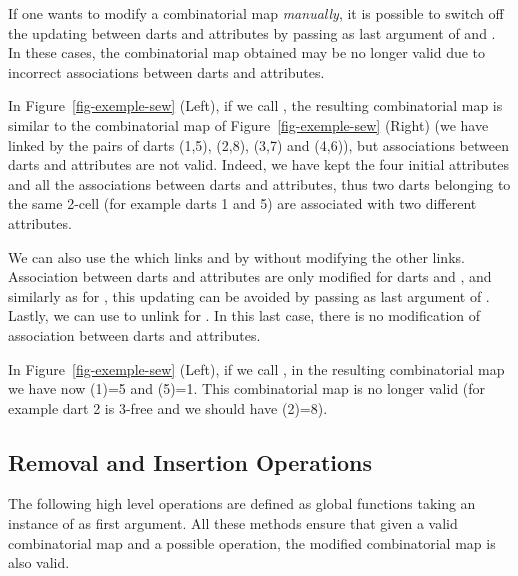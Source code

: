 \begin{ccAdvanced}
  If one wants to modify a combinatorial map \emph{manually}, it is 
  possible to switch off the updating between
  darts and attributes by passing  as last argument of
   and
  .  In these cases, the
  combinatorial map obtained may be no longer valid due to incorrect
  associations between darts and attributes.
  
  In Figure~\ref{fig-exemple-sew} (Left), if we call
  , the resulting combinatorial map is similar
  to the combinatorial map of Figure~\ref{fig-exemple-sew} (Right)
  (we have linked by \betatrois{} the pairs of darts (1,5), (2,8),
  (3,7) and (4,6)), but associations between darts and attributes
  are not valid. Indeed, we have kept the four initial attributes
  and all the associations between darts and attributes, thus two
  darts belonging to the same 2-cell (for example darts 1 and 5) are
  associated with two different attributes.

  We can also use the
   which links
   and  by \betai{} without modifying the other
  links.
  Association between darts and attributes are only modified for darts
   and , and similarly as for , this
  updating can be avoided by passing  as last argument of
  .  Lastly, we can use
   to unlink  for \betai{}. In this
  last case, there is no modification of association between darts and
  attributes.

  In Figure~\ref{fig-exemple-sew} (Left), if we call
  , in the resulting combinatorial map we have
  now \betatrois{}(1)=5 and \betatrois{}(5)=1. This combinatorial map is no
  longer valid (for example dart 2 is 3-free and we should have
  \betatrois{}(2)=8).

\end{ccAdvanced}

\subsection{Removal and Insertion Operations}\label{ssec-operations}

The following high level operations are defined as global functions
taking an instance  of  as first
argument.  All these methods ensure that given a valid combinatorial
map and a possible operation, the modified combinatorial map is also
valid.

